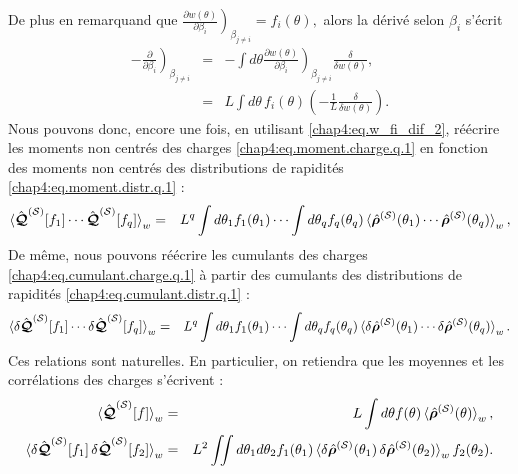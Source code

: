 De plus en remarquand que 
\(
	\left. \frac{ \partial w (\theta) }{ \partial \beta_i } \right)_{\beta_{j\neq i}} = f_i(\theta) ,		
\)
alors la dérivé selon $\beta_i$ s'écrit 
\begin{eqnarray}\label{chap4:eq.w_fi_dif_2}
	-\left. \frac{ \partial}{ \partial \beta_i } \right)_{\beta_{j\neq i}} & = & - \int d \theta  \left. \frac{ \partial w (\theta) }{ \partial \beta_i } \right)_{\beta_{j\neq i}} \frac{\delta}{\delta w(\theta)} \nonumber ,\\
	& = & L \int d\theta \, f_i(\theta) \left ( - \frac{1}{L} 	\frac{\delta}{\delta w(\theta)} \right ) \label{chap4:eq.moment.charge.q.2}.
\end{eqnarray}
Nous pouvons donc, encore une fois, en utilisant \eqref{chap4:eq.w_fi_dif_2}, réécrire les moments non centrés des charges \eqref{chap4:eq.moment.charge.q.1} en fonction des moments non centrés des distributions de rapidités \eqref{chap4:eq.moment.distr.q.1} : 
\begin{eqnarray}
	\braket{\hat{\bm{\mathcal{Q}}}^{(\mathcal{S})}[f_1] \cdots \hat{\bm{\mathcal{Q}}}^{(\mathcal{S})}[f_q]}_w  & = & L^q \int d\theta_1 f_1(\theta_1)  \cdots  \int d\theta_q f_q(\theta_q)  \braket{\hat{\bm{\rho}}^{(\mathcal{S})}(\theta_1)\cdots \hat{\bm{\rho}}^{(\mathcal{S})}(\theta_q)}_w,	
\end{eqnarray}
De même, nous pouvons réécrire les cumulants des charges \eqref{chap4:eq.cumulant.charge.q.1} à partir des cumulants des distributions de rapidités \eqref{chap4:eq.cumulant.distr.q.1} :
\begin{eqnarray}
	\braket{\delta\hat{\bm{\mathcal{Q}}}^{(\mathcal{S})}[f_1] \cdots \delta\hat{\bm{\mathcal{Q}}}^{(\mathcal{S})}[f_q]}_w  & = & L^q \int d\theta_1 f_1(\theta_1)  \cdots  \int d\theta_q f_q(\theta_q)  \braket{\delta\hat{\bm{\rho}}^{(\mathcal{S})}(\theta_1)\cdots \delta\hat{\bm{\rho}}^{(\mathcal{S})}(\theta_q)}_w.	
\end{eqnarray}
Ces relations sont naturelles. En particulier, on retiendra que les moyennes et les corrélations des charges s’écrivent :
\begin{eqnarray}
	\braket{\hat{\bm{\mathcal{Q}}}^{(\mathcal{S})}[f] }_w  & = & L \int d\theta f(\theta)  \braket{\hat{\bm{\rho}}^{(\mathcal{S})}(\theta)}_w,\\
	\braket{\delta\hat{\bm{\mathcal{Q}}}^{(\mathcal{S})}[f_1] \, \delta\hat{\bm{\mathcal{Q}}}^{(\mathcal{S})}[f_2]}_w  & = & L^2 \iint d\theta_1 d\theta_2 f_1(\theta_1) \braket{\delta\hat{\bm{\rho}}^{(\mathcal{S})}(\theta_1)\, \delta\hat{\bm{\rho}}^{(\mathcal{S})}(\theta_2)}_w  f_2(\theta_2) .		
\end{eqnarray}



